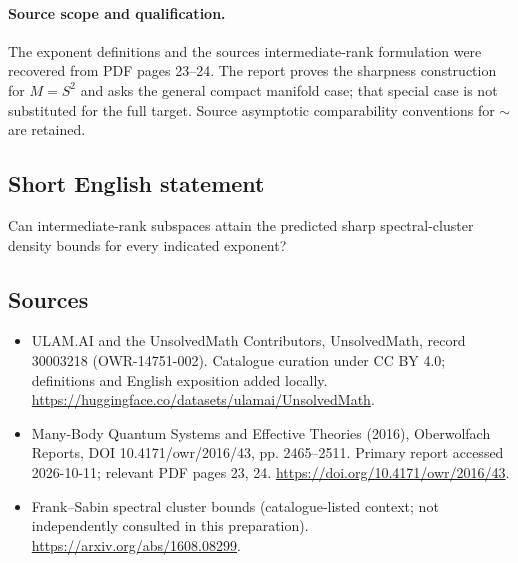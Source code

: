 \documentclass[11pt]{article}
\begin{document}
\paragraph{Source scope and qualification.}
The exponent definitions and the source\textquotesingle s intermediate-rank formulation were recovered from PDF pages 23--24. The report proves the sharpness construction for $M=S^2$ and asks the general compact manifold case; that special case is not substituted for the full target. Source asymptotic comparability conventions for $\sim$ are retained.
\subsection{Short English statement}
Can intermediate-rank subspaces attain the predicted sharp spectral-cluster density bounds for every indicated exponent?
\subsection{Sources}
\begin{itemize}
\item[\hypertarget{source:30003218:1}{S1}] ULAM.AI and the UnsolvedMath Contributors, UnsolvedMath, record 30003218 (OWR-14751-002). Catalogue curation under CC BY 4.0; definitions and English exposition added locally.
\url{https://huggingface.co/datasets/ulamai/UnsolvedMath}.
\item[\hypertarget{source:30003218:2}{S2}] Many-Body Quantum Systems and Effective Theories (2016), Oberwolfach Reports, DOI 10.4171/owr/2016/43, pp. 2465--2511. Primary report accessed 2026-10-11; relevant PDF pages 23, 24.
\url{https://doi.org/10.4171/owr/2016/43}.
\item[\hypertarget{source:30003218:3}{S3}] Frank--Sabin spectral cluster bounds (catalogue-listed context; not independently consulted in this preparation).
\url{https://arxiv.org/abs/1608.08299}.
\end{itemize}
\label{end:30003218}
\end{document}
